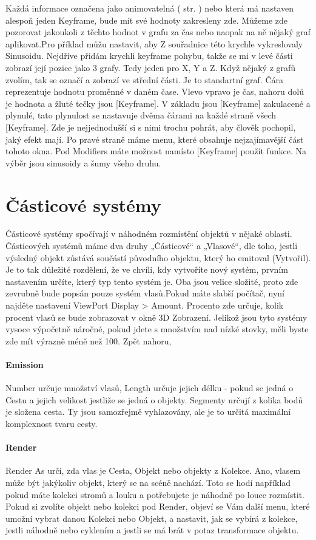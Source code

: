 \documentclass[12pt,a4paper]{report}
\begin{document}
	
	Každá informace označena jako animovatelná (
	str. \pageref{section:animated-settings}) nebo která má nastaven alespoň jeden Keyframe, bude mít své
	hodnoty zakresleny zde. Můžeme zde pozorovat jakoukoli z těchto hodnot
	v grafu za čas nebo naopak na ně nějaký graf aplikovat.Pro příklad můžu nastavit, aby Z souřadnice této krychle vykreslovaly
	Sinusoidu. Nejdříve přidám krychli keyframe pohybu, takže se mi v levé
	části zobrazí její pozice jako 3 grafy. Tedy jeden pro X, Y a Z. Když nějaký
	z grafů zvolím, tak se označí a zobrazí ve střední části. Je to standartní
	graf. Čára reprezentuje hodnotu proměnné v daném čase. Vlevo vpravo je
	čas, nahoru dolů je hodnota a žluté tečky jsou [Keyframe]. V základu jsou
	[Keyframe] zakulacené a plynulé, tato plynulost se nastavuje dvěma
	čárami na každé straně všech [Keyframe]. Zde je nejjednodušší si s nimi
	trochu pohrát, aby člověk pochopil, jaký efekt mají.
	Po pravé straně máme menu, které obsahuje nejzajímavější část tohoto
	okna. Pod Modifiers máte možnost namísto [Keyframe] použít funkce. Na
	výběr jsou sinusoidy a šumy všeho druhu.
	
	
	\section{Částicové systémy}
	Částicové systémy spočívají v náhodném rozmístění objektů v nějaké
	oblasti. Částicových systémů máme dva druhy „Částicové“ a „Vlasové“,
	dle toho, jestli výsledný objekt zůstává součástí původního objektu, který
	ho emitoval (Vytvořil). Je to tak důležité rozdělení, že ve chvíli, kdy
	vytvoříte nový systém, prvním nastavením určíte, který typ tento systém
	je. Oba jsou velice složité, proto zde zevrubně bude popsán pouze systém
	vlasů.Pokud máte slabší počítač, nyní najděte nastavení ViewPort Display >
	Amount. Procento zde určuje, kolik procent vlasů se bude zobrazovat
	v okně 3D Zobrazení. Jelikož jsou tyto systémy vysoce výpočetně
	náročné, pokud jdete s množstvím nad nízké stovky, měli byste zde mít
	výrazně méně než 100.
	Zpět nahoru, \paragraph{Emission} Number určuje množství vlasů, Length určuje
	jejich délku - pokud se jedná o Cestu a jejich velikost jestliže se jedná o
	objekty. Segmenty určují z kolika bodů je složena cesta. Ty jsou
	samozřejmě vyhlazovány, ale je to určitá maximální komplexnost tvaru
	cesty.
	\paragraph{Render} Render As určí, zda vlas je Cesta, Objekt nebo objekty z
	Kolekce. Ano, vlasem může být jakýkoliv objekt, který se na scéně
	nachází. Toto se hodí například pokud máte kolekci stromů a louku a
	potřebujete je náhodně po louce rozmístit. Pokud si zvolíte objekt nebo
	kolekci pod Render, objeví se Vám další menu, které umožní vybrat danou
	Kolekci nebo Objekt, a nastavit, jak se vybírá z kolekce, jestli náhodně
	nebo cyklením a jestli se má brát v potaz transformace objektu.
\end{document}
